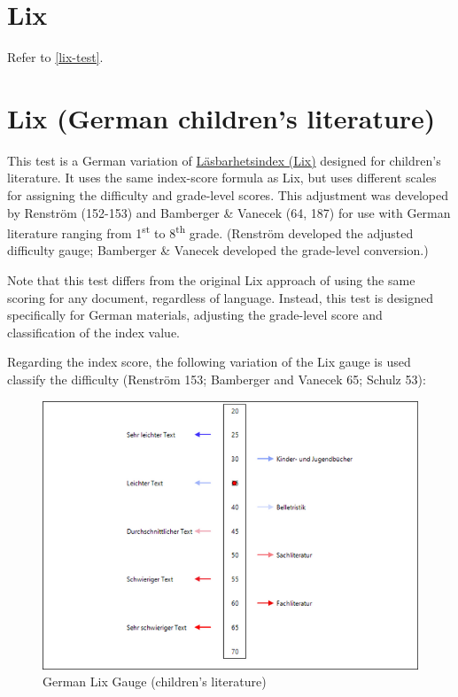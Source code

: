 \documentclass[
]{book}
\theoremstyle{definition}
\theoremstyle{definition}
\theoremstyle{definition}
\theoremstyle{definition}
\theoremstyle{remark}
\begin{document}
\newpage

\hypertarget{lix-german}{%
\section{Lix}\label{lix-german}}

Refer to \ref{lix-test}.

\hypertarget{lix-german-childrens-literature}{%
\section{\texorpdfstring{Lix (German children's literature)}{Lix (German children's literature)}}\label{lix-german-childrens-literature}}

This test is a German variation of \protect\hyperlink{lix-test}{Läsbarhetsindex (Lix)} designed for children's literature. It uses the same index-score formula as Lix, but uses different scales for assigning the difficulty and grade-level scores. This adjustment was developed by Renström (152-153) and Bamberger \& Vanecek (64, 187) for use with German literature ranging from 1\textsuperscript{st} to 8\textsuperscript{th} grade. (Renström developed the adjusted difficulty gauge; Bamberger \& Vanecek developed the grade-level conversion.)

Note that this test differs from the original Lix approach of using the same scoring for any document, regardless of language. Instead, this test is designed specifically for German materials, adjusting the grade-level score and classification of the index value.

Regarding the index score, the following variation of the Lix gauge is used classify the difficulty (Renström 153; Bamberger and Vanecek 65; Schulz 53):

\begin{figure}[H]

{\centering \includegraphics[width=0.75\linewidth,]{Images/GermanLixGauge} 

}

\caption{German Lix Gauge (children's literature)}\label{fig:germanLix}
\end{figure}
\end{document}
